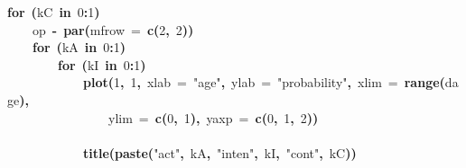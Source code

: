 \documentclass{article}
\makeatletter
\newcommand{\hlnumber}[1]{\textcolor[rgb]{0,0,0}{#1}}%
\newcommand{\hlfunctioncall}[1]{\textcolor[rgb]{.5,0,.33}{\textbf{#1}}}%
\newcommand{\hlstring}[1]{\textcolor[rgb]{.6,.6,1}{#1}}%
\newcommand{\hlkeyword}[1]{\textbf{#1}}%
\newcommand{\hlargument}[1]{\textcolor[rgb]{.69,.25,.02}{#1}}%
\newcommand{\hlassignement}[1]{\textbf{#1}}%
\newcommand{\hlsymbol}[1]{#1}%
\newcommand{\hlstd}[1]{\textcolor[rgb]{0,0,0}{#1}}%
\newenvironment{kframe}{%
 \def\FrameCommand##1{\hskip\@totalleftmargin \hskip-\fboxsep
 \colorbox{shadecolor}{##1}\hskip-\fboxsep
     \hskip-\linewidth \hskip-\@totalleftmargin \hskip\columnwidth}%
 \MakeFramed {\advance\hsize-\width
   \@totalleftmargin\z@ \linewidth\hsize
   \@setminipage}}%
 {\par\unskip\endMakeFramed}
\newenvironment{knitrout}{}{} %
\makeatother
\begin{document}
\begin{knitrout}
{\begin{kframe}
\begin{flushleft}
\hlstd{}\hlkeyword{for}{\ }\hlkeyword{(}\hlsymbol{kC}{\ }\hlkeyword{in}{\ }\hlnumber{0}\hlkeyword{:}\hlnumber{1}\hlkeyword{)}{\ }\hlkeyword{\usebox{\hlnormalsizeboxopenbrace}}\hspace*{\fill}\\
\hlstd{}{\ }{\ }{\ }{\ }\hlsymbol{op}{\ }\hlassignement{\usebox{\hlnormalsizeboxlessthan}-}{\ }\hlfunctioncall{par}\hlkeyword{(}\hlargument{mfrow}{\ }\hlargument{=}{\ }\hlfunctioncall{c}\hlkeyword{(}\hlnumber{2}\hlkeyword{,}{\ }\hlnumber{2}\hlkeyword{)}\hlkeyword{)}\hspace*{\fill}\\
\hlstd{}{\ }{\ }{\ }{\ }\hlkeyword{for}{\ }\hlkeyword{(}\hlsymbol{kA}{\ }\hlkeyword{in}{\ }\hlnumber{0}\hlkeyword{:}\hlnumber{1}\hlkeyword{)}{\ }\hlkeyword{\usebox{\hlnormalsizeboxopenbrace}}\hspace*{\fill}\\
\hlstd{}{\ }{\ }{\ }{\ }{\ }{\ }{\ }{\ }\hlkeyword{for}{\ }\hlkeyword{(}\hlsymbol{kI}{\ }\hlkeyword{in}{\ }\hlnumber{0}\hlkeyword{:}\hlnumber{1}\hlkeyword{)}{\ }\hlkeyword{\usebox{\hlnormalsizeboxopenbrace}}\hspace*{\fill}\\
\hlstd{}{\ }{\ }{\ }{\ }{\ }{\ }{\ }{\ }{\ }{\ }{\ }{\ }\hlfunctioncall{plot}\hlkeyword{(}\hlnumber{1}\hlkeyword{,}{\ }\hlnumber{1}\hlkeyword{,}{\ }\hlargument{xlab}{\ }\hlargument{=}{\ }\hlstring{"age"}\hlkeyword{,}{\ }\hlargument{ylab}{\ }\hlargument{=}{\ }\hlstring{"probability"}\hlkeyword{,}{\ }\hlargument{xlim}{\ }\hlargument{=}{\ }\hlfunctioncall{range}\hlkeyword{(}\hlsymbol{d}\hlkeyword{\usebox{\hlnormalsizeboxdollar}}\hlsymbol{age}\hlkeyword{)}\hlkeyword{,}\hspace*{\fill}\\
\hlstd{}{\ }{\ }{\ }{\ }{\ }{\ }{\ }{\ }{\ }{\ }{\ }{\ }{\ }{\ }{\ }{\ }\hlargument{ylim}{\ }\hlargument{=}{\ }\hlfunctioncall{c}\hlkeyword{(}\hlnumber{0}\hlkeyword{,}{\ }\hlnumber{1}\hlkeyword{)}\hlkeyword{,}{\ }\hlargument{yaxp}{\ }\hlargument{=}{\ }\hlfunctioncall{c}\hlkeyword{(}\hlnumber{0}\hlkeyword{,}{\ }\hlnumber{1}\hlkeyword{,}{\ }\hlnumber{2}\hlkeyword{)}\hlkeyword{)}\hspace*{\fill}\\
\hlstd{}\hspace*{\fill}\\
\hlstd{}{\ }{\ }{\ }{\ }{\ }{\ }{\ }{\ }{\ }{\ }{\ }{\ }\hlfunctioncall{title}\hlkeyword{(}\hlfunctioncall{paste}\hlkeyword{(}\hlstring{"act"}\hlkeyword{,}{\ }\hlsymbol{kA}\hlkeyword{,}{\ }\hlstring{"inten"}\hlkeyword{,}{\ }\hlsymbol{kI}\hlkeyword{,}{\ }\hlstring{"cont"}\hlkeyword{,}{\ }\hlsymbol{kC}\hlkeyword{)}\hlkeyword{)}\hspace*{\fill}\\

\end{flushleft}
\end{kframe}}
\end{knitrout}
\end{document}
